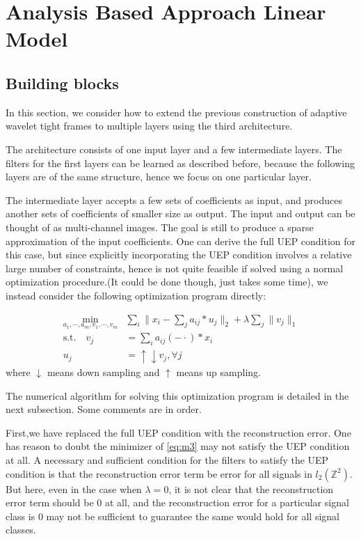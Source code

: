 \documentclass[a4paper]{article}
\begin{document}
\section{Analysis Based Approach Linear Model}
\subsection{Building blocks}
In this section, we consider how to extend the previous construction of adaptive wavelet tight frames to multiple layers using the third architecture.

The architecture consists of one input layer and a few intermediate layers. The filters for the first layers can be learned as described before, because the following layers are of the same structure, hence we focus on one particular layer. 

The intermediate layer accepts a few sets of coefficients as input, and produces another sets of coefficients of smaller size as output. The input and output can be thought of as multi-channel images. The goal is still to produce a sparse approximation of the input coefficients. One can derive the full UEP condition for this case, but since explicitly incorporating the UEP condition involves a relative large number of constraints, hence is not quite feasible if solved using a  normal optimization procedure.(It could be done though, just takes some time), we instead consider the following optimization program directly:

\begin{equation}
\label{eq:m3}
\begin{aligned}
	\min_{a_1,\cdots,a_m, v_1,\cdots,v_m}& \sum_i \|x_i - \sum_j a_{ij}*u_j\|_2 +\lambda \sum_j \|v_j\|_1 \\
	 \textrm{s.t.}  \quad v_j& = \sum_{i} a_{ij}(-\cdot)*x_i \\
		u_j&=\uparrow\downarrow v_j, \forall j
	\end{aligned}
\end{equation}
where $\downarrow$ means down sampling and $\uparrow$ means up sampling.

The numerical algorithm for solving this optimization program is detailed in the next subsection.   Some comments are in order.

First,we have replaced the full UEP condition with the reconstruction error. One has reason to doubt the minimizer of \eqref{eq:m3} may not satisfy the UEP condition at all. A necessary and sufficient condition for the filters to satisfy the UEP condition is that  the reconstruction error term be error for all signals in $l_2(\mathbb Z^2)$. But here, even in the case when $\lambda=0$, it is not clear that the reconstruction error term should be $0$ at all, and the reconstruction error for a particular signal class is $0$ may not be sufficient to guarantee the same would hold for all signal classes.
\end{document}
